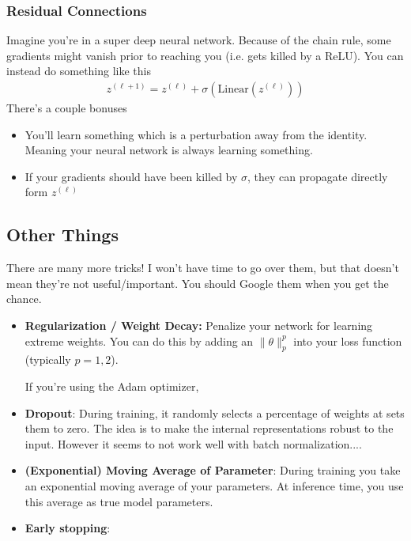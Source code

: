 \subsubsection{Residual Connections}
Imagine you're in a super deep neural network. Because of the chain rule, some gradients might vanish prior to reaching you (i.e. gets killed by a ReLU). You can instead do something like this
\begin{align}
	z^{(\ell+1)} =  z^{(\ell)} + \sigma(\text{Linear}(z^{(\ell)}))
\end{align}
There's a couple bonuses
\begin{itemize}
	\item You'll learn something which is a perturbation away from the identity. Meaning your neural network is always learning something.
	\item If your gradients should have been killed by $\sigma$, they can propagate directly form $z^{(\ell)}$
\end{itemize}


\subsection{Other Things}
There are many more tricks! I won't have time to go over them, but that doesn't mean they're not useful/important. You should Google them when you get the chance.
\begin{itemize}
	\item \textbf{Regularization / Weight Decay:} Penalize your network for learning extreme weights. You can do this by adding an $\|\theta\|_p^p$ into your loss function (typically $p=1,2$). 
	
	If you're using the Adam optimizer, 
	\item \textbf{Dropout}: During training, it randomly selects a percentage of weights at sets them to zero. The idea is to make the internal representations robust to the input. However it seems to not work well with batch normalization....
	\item \textbf{(Exponential) Moving Average of Parameter}: During training you take an exponential moving average of your parameters. At inference time, you use this average as true model parameters.
	\item \textbf{Early stopping}:
\end{itemize}




